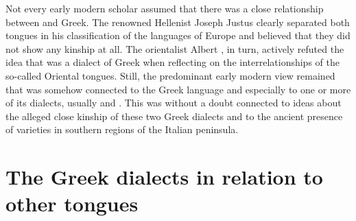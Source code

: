 Not every early modern scholar assumed that there was a close relationship between  and Greek. The renowned Hellenist Joseph Justus \citet{Scaliger1610} clearly separated both tongues in his classification of the languages of Europe and believed that they did not show any kinship at all. The orientalist Albert \citet[109]{Schultens1738b}, in turn, actively refuted the idea that  was a dialect of Greek when reflecting on the interrelationships of the so-called Oriental tongues. Still, the predominant early modern view remained that  was somehow connected to the Greek language and especially to one or more of its dialects, usually  and . This was without a doubt connected to ideas about the alleged close kinship of these two Greek dialects and to the ancient presence of  varieties in southern regions of the Italian peninsula.

\section{The Greek dialects in relation to other tongues}\label{sec:5.7}

